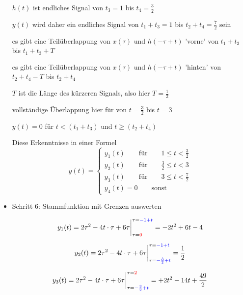 \documentclass[11pt,a4paper,DIV=12]{scrartcl}
\numberwithin{equation}{section}
\numberwithin{figure}{section}
\newcommand{\red}{\textcolor{red}}
\newcommand{\blue}{\textcolor{blue}}
\begin{document}
\begin{ExCalc}
\begin{itemize}
  $h(t)$ ist endliches Signal von $t_3=1$ bis $t_4=\frac{3}{2}$

  $y(t)$ wird daher ein endliches Signal von $t_1+t_3=1$ bis $t_2+t_4=\frac{7}{2}$ sein

  es gibt eine Teilüberlappung von $x(\tau)$ und $h(-\tau+t)$  'vorne' von
  $t_1+t_3$ bis $t_1+t_3+T$

  es gibt eine Teilüberlappung von $x(\tau)$ und $h(-\tau+t)$  'hinten' von
  $t_2+t_4-T$ bis $t_2+t_4$

  $T$ ist die Länge des kürzeren Signals, also hier $T=\frac{1}{2}$

  vollständige Überlappung hier für von $t = \frac{3}{2}$ bis $t=3$

  $y(t)=0$ für $t<(t_1+t_3)$ und $t\geq(t_2+t_4)$

  Diese Erkenntnisse in einer Formel
  \begin{equation}
  y(t) =
  \begin{cases}
    y_1(t) \qquad \mathrm{für} \qquad 1 \leq t < \frac{3}{2}\\
    y_2(t) \qquad \mathrm{für} \qquad \frac{3}{2} \leq t < 3\\
    y_3(t) \qquad \mathrm{für} \qquad 3 \leq t < \frac{7}{2}\\
    y_4(t)=0 \qquad \mathrm{sonst}
  \end{cases}
  \end{equation}

  \item Schritt 6:  Stammfunktion mit Grenzen auswerten

  \begin{equation}
  y_1(t) = 2 \tau^2 - 4 t \cdot \tau + 6 \tau\bigg|_{\tau=\red{0}}^{\tau=\blue{-1+t}}
  = -2 t^2 + 6 t - 4
  \end{equation}

  \begin{equation}
  y_2(t) = 2 \tau^2 - 4 t \cdot \tau + 6 \tau\bigg|_{\tau=\blue{-\frac{3}{2}+t}}^{\tau=\blue{-1+t}}  = \frac{1}{2}
  \end{equation}

  \begin{equation}
  y_3(t) = 2 \tau^2 - 4 t \cdot \tau + 6 \tau\bigg|_{\tau=\blue{-\frac{3}{2}+t}}^{\tau=\red{2}} = +2 t^2 - 14 t + \frac{49}{2}
  \end{equation}

\end{itemize}
\end{ExCalc}
\end{document}
